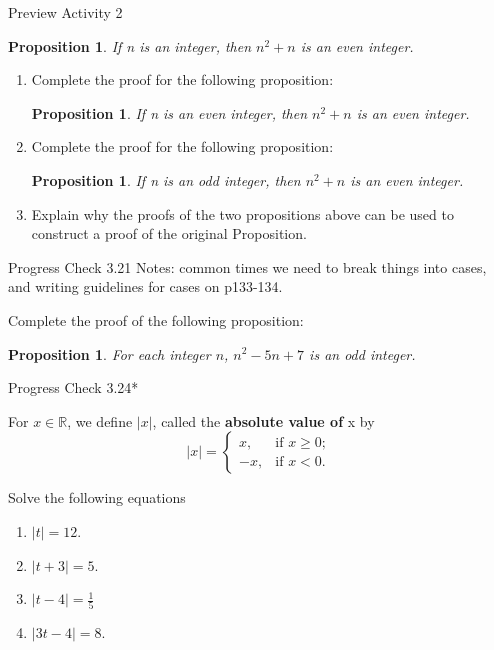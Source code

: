 \documentclass{beamer}
\newtheorem{prop}[theorem]{Proposition}
\begin{document}
\begin{frame}{Preview Activity 2}
    \begin{prop}
        If n is an integer, then $n^2 + n$ is an even integer.
    \end{prop} \pause
    \begin{enumerate}
        \item Complete the proof for the following proposition:
        \begin{prop}
            If n is an even integer, then $n^2 + n$ is an even integer.
        \end{prop} \pause
        \item Complete the proof for the following proposition:
        \begin{prop}
            If n is an odd integer, then $n^2 + n$ is an even integer.
        \end{prop} \pause
        \item Explain why the proofs of the two propositions above can be used to construct a proof of the original Proposition.
    \end{enumerate}
\end{frame}

\begin{frame}{Progress Check 3.21}
    Notes: common times we need to break things into cases, and writing guidelines for cases on p133-134. \pause
    
    Complete the proof of the following proposition:
    \begin{prop}
        For each integer $n$, $n^2 - 5n + 7$ is an odd integer.
    \end{prop} 
\end{frame}

\begin{frame}{Progress Check 3.24*}
    \begin{definition}
    For $x \in \mathbb{R}$, we define $|x|$, called the \textbf{absolute value of} x by
    \[
    |x| = \begin{cases}
    x, & \text{if } x \geq 0;\\
    -x, & \text{if } x < 0.
    \end{cases}
    \]
    \end{definition}
\pause

    Solve the following equations
    \begin{enumerate}
        \item $|t| = 12$.
        \item $|t+3| = 5$.
        \item $|t-4| = \frac{1}{5}$
        \item $|3t - 4| = 8$.
    \end{enumerate}
\end{frame}
\end{document}
